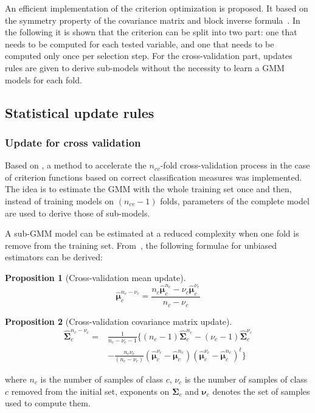 \documentclass[journal]{IEEEtran}
\newtheorem{prop}{Proposition}
\begin{document}
An efficient implementation of the criterion optimization is proposed.
It based on  the symmetry property of the covariance  matrix and block
inverse  formula~\cite{IMM2012-03274}. In  the following  it is  shown
that the criterion  can be split into  two part: one that  needs to be
computed for each  tested variable, and one that needs  to be computed
only once per  selection step. For the  cross-validation part, updates
rules are given to derive sub-models  without the necessity to learn a
GMM models for each fold.

\subsection{Statistical update rules}
        \subsubsection{Update for cross validation}
        \label{sec:update-cv}
        Based on \cite{fauvel2015fast}, a method to accelerate the $n_{cv}$-fold cross-validation process in the case of criterion functions based on correct classification measures was implemented. The idea is to estimate the GMM with the whole training set once and then, instead of training models on $(n_{cv}-1)$ folds, parameters of the complete model are used to derive those of sub-models.

        A sub-GMM model can be estimated at a reduced complexity when one fold is remove from the training set. From~\cite{fauvel2015fast}, the following formulae for unbiased estimators can be derived:
        \begin{prop}[Cross-validation mean update]
            \label{eq:update-cv1}
            \begin{equation*}
                \boldsymbol{\hat{\mu}}_c^{n_c-\nu_c} = \frac{n_c \boldsymbol{\hat{\mu}}_c^{n_c} - \nu_c \boldsymbol{\hat{\mu}}_c^{\nu_c}}{n_c - \nu_c} \nonumber
            \end{equation*}
        \end{prop}
        \begin{prop}[Cross-validation covariance matrix update]
            \label{eq:update-cv2}
            \begin{align*}
              \boldsymbol{\hat{\Sigma}}_c^{n_c-\nu_c} = &\frac{1}{n_c-\nu_c-1} \biggl\{ (n_c-1) \boldsymbol{\hat{\Sigma}}_c^{n_c} - (\nu_c-1)\boldsymbol{\hat{\Sigma}}_c^{\nu_c} \nonumber \\
                                                        &- \frac{n_c \nu_c}{(n_c-\nu_c)} (\boldsymbol{\hat{\mu}}_c^{\nu_c}-\boldsymbol{\hat{\mu}}_c^{n_c})(\boldsymbol{\hat{\mu}}_c^{\nu_c}-\boldsymbol{\hat{\mu}}_c^{n_c})^t \biggr\} \nonumber
            \end{align*}
        \end{prop}
        \noindent where $n_c$ is the number of samples of class $c$, $\nu_c$ is the number of samples of class $c$ removed from the initial set, exponents on $\boldsymbol{\Sigma}_c$ and $\boldsymbol{\nu}_c$ denotes the set of samples used to compute them.
\end{document}
